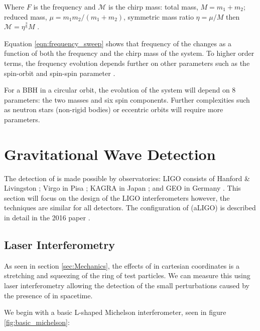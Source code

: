 Where $F$ is the \gw frequency and $\mathcal{M}$ is the chirp mass: total mass, $M = m_1 + m_2$; reduced mass, $\mu = m_1 m_2/(m_1+m_2)$, symmetric mass ratio $\eta = \mu/M$ then $\mathcal{M} = \eta^\frac{3}{5} M$ \cite{PoissonWill}.

Equation \ref{eqn:frequency_sweep} shows that frequency of the \gw changes as a function of both the frequency and the chirp mass of the system. To higher order terms, the frequency evolution depends further on other parameters such as the spin-orbit and spin-spin parameter \cite{Will1993}.

For a BBH in a circular orbit, the evolution of the system will depend on 8 parameters: the two masses and six spin components. Further complexities such as neutron stars (non-rigid bodies) or eccentric orbits will require more parameters.

\section{\label{sec:IFOs}Gravitational Wave Detection}

The detection of \gws is made possible by \gw observatories: LIGO consists of Hanford \& Livingston \cite{aligo}; Virgo in Pisa \cite{avirgo}; KAGRA in Japan \cite{kagra}; and GEO in Germany \cite{geo}. This section will focus on
the design of the LIGO interferometers however, the techniques are similar for all detectors. The configuration of \aligo (aLIGO) is described in detail in the 2016 paper \cite{aligo}.

\subsection{\label{sec:laser_interferometry}Laser Interferometry}

As seen in section \ref{sec:Mechanics}, the effects of \gws in cartesian coordinates is a stretching and squeezing of the ring of test particles. We can measure this using laser interferometry allowing the detection of the small
perturbations caused by the presence of \gws in spacetime.

We begin with a basic L-shaped Michelson interferometer, seen in figure \ref{fig:basic_michelson}:

